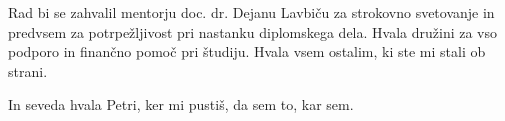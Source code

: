 








\begin{Acknowledgements}

Rad bi se zahvalil mentorju doc. dr. Dejanu Lavbiču za strokovno svetovanje in predvsem za potrpežljivost pri nastanku diplomskega dela. Hvala družini za vso podporo in finančno pomoč pri študiju. Hvala vsem ostalim, ki ste mi stali ob strani.

In seveda hvala Petri, ker mi pustiš, da sem to, kar sem.
\end{Acknowledgements}